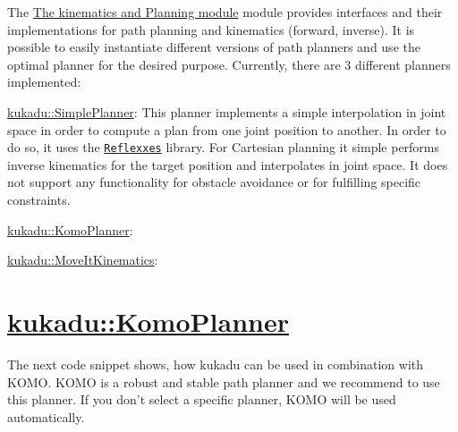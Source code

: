 The \hyperlink{index_kinematics}{The kinematics and Planning module} module provides interfaces and their implementations for path planning and kinematics (forward, inverse). It is possible to easily instantiate different versions of path planners and use the optimal planner for the desired purpose. Currently, there are 3 different planners implemented\-:
\begin{DoxyItemize}
\item \hyperlink{classkukadu_1_1SimplePlanner}{kukadu\-::\-Simple\-Planner}\-: This planner implements a simple interpolation in joint space in order to compute a plan from one joint position to another. In order to do so, it uses the \href{http://www.reflexxes.ws/}{\tt Reflexxes} library. For Cartesian planning it simple performs inverse kinematics for the target position and interpolates in joint space. It does not support any functionality for obstacle avoidance or for fulfilling specific constraints.
\item \hyperlink{classkukadu_1_1KomoPlanner}{kukadu\-::\-Komo\-Planner}\-:
\item \hyperlink{classkukadu_1_1MoveItKinematics}{kukadu\-::\-Move\-It\-Kinematics}\-:
\end{DoxyItemize}

\section*{\hyperlink{classkukadu_1_1KomoPlanner}{kukadu\-::\-Komo\-Planner}}

The next code snippet shows, how kukadu can be used in combination with K\-O\-M\-O. K\-O\-M\-O is a robust and stable path planner and we recommend to use this planner. If you don't select a specific planner, K\-O\-M\-O will be used automatically.


